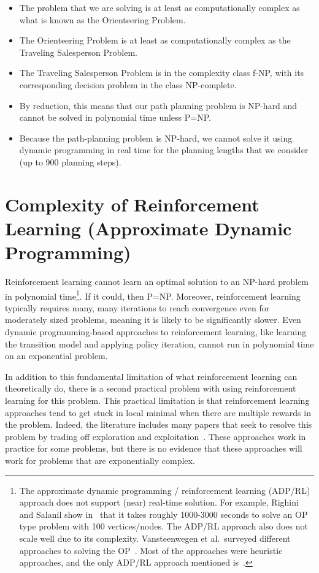 \begin{itemize}
\item The problem that we are solving is at least as computationally complex as what is known as the Orienteering Problem.  
\item The Orienteering Problem is at least as computationally complex as the Traveling Salesperson Problem.
\item The Traveling Salesperson Problem is in the complexity class f-NP, with its corresponding decision problem in the class NP-complete.
\item By reduction, this means that our path planning problem is NP-hard and cannot be solved in polynomial time unless P=NP.
\item Because the path-planning problem is NP-hard, we cannot solve it using dynamic programming in real time for the planning lengths that we consider (up to 900 planning steps).
\end{itemize}

\section{Complexity of Reinforcement Learning (Approximate Dynamic Programming)}
\label{RLComplexity}

Reinforcement learning cannot learn an optimal solution to an NP-hard problem in polynomial time\footnote{The approximate dynamic programming / reinforcement learning (ADP/RL) approach does not support (near) real-time solution. For example, Righini and Salanil show in~\cite{Righini2009Decremental} that it takes roughly 1000-3000 seconds to solve an OP type problem with 100 vertices/nodes. The ADP/RL approach also does not scale well due to its complexity. Vansteenwegen et al.\ surveyed different approaches to solving the OP~\cite{Vansteenwegen2011Orienteering}. Most of the approaches were heuristic approaches, and the only ADP/RL approach mentioned is~\cite{Righini2009Decremental}.}. If it could, then P=NP. Moreover, reinforcement learning typically requires many, many iterations to reach convergence even for moderately sized problems, meaning it is likely to be significantly slower.  Even dynamic programming-based approaches to reinforcement learning, like learning the transition model and applying policy iteration, cannot run in polynomial time on an exponential problem.

In addition to this fundamental limitation of what reinforcement learning can theoretically do, there is a second practical problem with using reinforcement learning for this problem. This practical limitation is that reinforcement learning approaches tend to get stuck in local minimal when there are multiple rewards in the problem.  Indeed, the literature includes many papers that seek to resolve this problem by trading off exploration and exploitation~\cite{Sutton1998Reinforcement}.  These approaches work in practice for some problems, but there is no evidence that these approaches will work for problems that are exponentially complex.  

